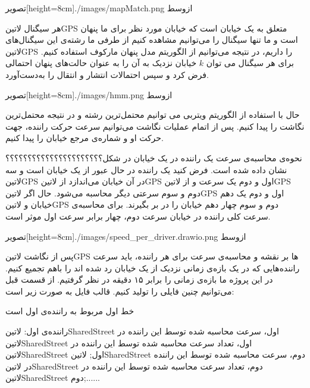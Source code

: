 

  ‌تصویر[height=8cm]{./images/mapMatch.png}
  ‌ازوسط

هر سیگنال ‌لاتین{GPS} متعلق به یک خیابان است که خیابان مورد نظر برای ما پنهان است و ما تنها سیگنال را می‌توانیم مشاهده کنیم
از طرفی ما رشته‌ی این سیگنال‌های ‌لاتین{GPS} را داریم، در نتیجه می‌توانیم از الگوریتم مدل پنهان مارکوف  استفاده کنیم.
برای هر سیگنال می توان $k$ خیابان نزدیک به آن را به عنوان حالت‌های پنهان احتمالی فرض کرد و سپس احتمالات انتشار و انتقال را به‌دست‌آورد.

  ‌تصویر[height=8cm]{./images/hmm.png}
  ‌ازوسط

حال با استفاده از الگوریتم ویتربی می توانیم محتمل‌ترین رشته و در نتیجه محتمل‌ترین نگاشت را پیدا کنیم.
پس از اتمام عملیات نگاشت می‌توانیم سرعت حرکت راننده، جهت حرکت او و شماره‌ی مرجع خیابان  را پیدا کنیم.

نحوه‌ی محاسبه‌ی سرعت یک راننده در یک خیابان در شکل؟؟؟؟؟؟؟؟؟؟؟؟؟؟؟؟؟؟؟؟؟؟ نشان داده شده است. فرض کنید یک راننده در حال عبور از یک خیابان است و سه ‌لاتین{‌GPS} در آن خیابان می‌اندازد از ‌لاتین{GPS} اول و دوم یک سرعت و از ‌لاتین{‌GPS} دوم و سوم سرعتی دیگر محاسبه می‌شود. حال اگر ‌لاتین{GPS} اول و دوم یک دهم خیابان و ‌لاتین{GPS} دوم و سوم چهار دهم خیابان را در بر بگیرند. برای محاسبه‌ی سرعت کلی راننده در خیابان سرعت دوم، چهار برابر سرعت اول موثر است.

  ‌تصویر[height=8cm]{./images/speed_per_driver.drawio.png}
  ‌ازوسط


پس از نگاشت ‌لاتین{GPS} ها بر نقشه و محاسبه‌ی سرعت برای هر راننده، باید سرعت راننده‌هایی که در یک بازه‌ی زمانی نزدیک از یک خیابان رد شده اند را باهم تجمیع کنیم. در این پروژه ما بازه‌ی زمانی را برابر ۱۵ دقیقه در نظر گرفتیم. از قسمت قبل می‌توانیم چنین فایلی را تولید کنیم. قالب فایل به صورت زیر است:

خط اول مربوط به راننده‌ی اول است

راننده‌ی اول: ‌لاتین{SharedStreet} اول، سرعت محاسبه شده توسط این راننده در ‌لاتین{SharedStreet} اول، تعداد سرعت محاسبه شده توسط این راننده در ‌لاتین{SharedStreet} اول;  ‌لاتین{SharedStreet} دوم، سرعت محاسبه شده توسط این راننده در ‌لاتین{SharedStreet} دوم، تعداد سرعت محاسبه شده توسط این راننده در ‌لاتین{SharedStreet} دوم;......

